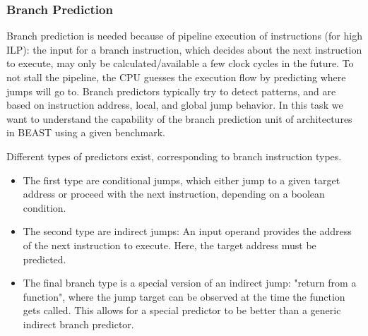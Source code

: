 \documentclass[a4paper,12pt]{exam}
\begin{document}
\begin{questions}
\end{questions}

\subsubsection*{Branch Prediction}

Branch prediction is needed because of pipeline execution of instructions (for high \ac{ILP}): the input for a branch instruction, which decides about the next instruction to execute, may only be calculated/available a few clock cycles in the future. To not stall the pipeline, the CPU guesses the execution flow by predicting where jumps will go to.
%
Branch predictors typically try to detect patterns, and are based on instruction address, local, and global jump behavior. In this task we want to understand the capability of the branch prediction unit of architectures in BEAST using a given benchmark.

Different types of predictors exist, corresponding to branch instruction types.
\begin{itemize}
\item The first type are conditional jumps, which either jump to a given target address or proceed
with the next instruction, depending on a boolean condition.
\item The second type are indirect jumps: An input operand provides the address of the next instruction to
execute. Here, the target address must be predicted.
\item The final branch type is a special version of an
indirect jump: "return from a function", where the jump target can be observed at the time the
function gets called. This allows for a special predictor to be better than a generic indirect
branch predictor.
\end{itemize}
\end{document}
